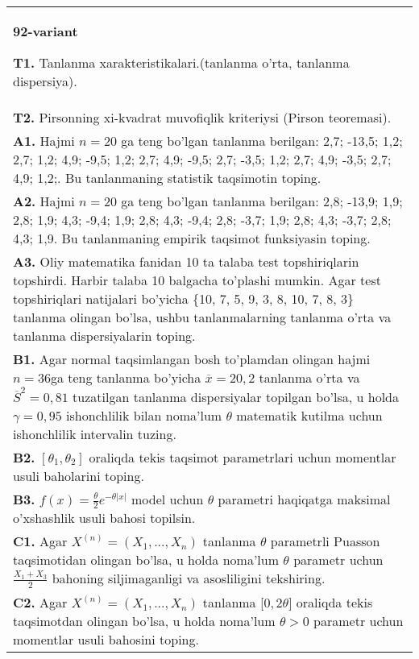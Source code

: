 \documentclass{article}
\begin{document}
\begin{tabular}{m{17cm}}
\textbf{92-variant}
\newline

\textbf{T1.} 
Tanlanma xarakteristikalari.(tanlanma o'rta, tanlanma dispersiya).
\\
\textbf{T2.} 
Pirsonning xi-kvadrat muvofiqlik kriteriysi (Pirson teoremasi).
\\
\textbf{A1.} 
Hajmi \(n = 20\) ga teng bo'lgan tanlanma berilgan: 2,7; -13,5; 1,2; 2,7; 1,2; 4,9; -9,5; 1,2; 2,7; 4,9; -9,5; 2,7; -3,5; 1,2; 2,7; 4,9; -3,5; 2,7; 4,9; 1,2;. Bu tanlanmaning statistik taqsimotin toping.
\\
\textbf{A2.} 
Hajmi \(n = 20\) ga teng bo'lgan tanlanma berilgan: 2,8; -13,9; 1,9; 2,8; 1,9; 4,3; -9,4; 1,9; 2,8; 4,3; -9,4; 2,8; -3,7; 1,9; 2,8; 4,3; -3,7; 2,8; 4,3; 1,9. Bu tanlanmaning empirik taqsimot funksiyasin toping.
\\
\textbf{A3.} 
Oliy matematika fanidan 10 ta talaba test topshiriqlarin topshirdi. Harbir talaba 10 balgacha to'plashi mumkin. Agar test topshiriqlari natijalari bo'yicha \{10, 7, 5, 9, 3, 8, 10, 7, 8, 3\} tanlanma olingan bo'lsa, ushbu tanlanmalarning tanlanma o'rta va tanlanma dispersiyalarin toping.
\\
\textbf{B1.} 
Agar normal taqsimlangan bosh to'plamdan olingan hajmi \(n = 36\)ga teng tanlanma bo'yicha \(\overline{x} = 20,2\) tanlanma o'rta va \({\overline{S}}^{2} = 0,81\) tuzatilgan tanlanma dispersiyalar topilgan bo'lsa, u holda \(\gamma = 0,95\) ishonchlilik bilan noma'lum \(\theta\) matematik kutilma uchun ishonchlilik intervalin tuzing.
\\
\textbf{B2.} 
\(\left\lbrack \theta_{1},\theta_{2} \right\rbrack\) oraliqda tekis taqsimot parametrlari uchun momentlar usuli baholarini toping.
\\
\textbf{B3.} 
\(f(x) = \frac{\theta}{2}e^{- \theta|x|}\) model uchun \(\theta\) parametri haqiqatga maksimal o'xshashlik usuli bahosi topilsin.
\\
\textbf{C1.} 
Agar \(X^{(n)} = \left( X_{1},...,X_{n} \right)\) tanlanma \(\theta\) parametrli Puasson taqsimotidan olingan bo'lsa, u holda noma'lum \(\theta\) parametr uchun \(\frac{X_{1} + X_{3}}{2}\) bahoning siljimaganligi va asosliligini tekshiring.
\\
\textbf{C2.} 
Agar \(X^{(n)} = \left( X_{1},...,X_{n} \right)\) tanlanma {[}\(0,2\theta\rbrack\) oraliqda tekis taqsimotdan olingan bo'lsa, u holda noma'lum \(\theta > 0\) parametr uchun momentlar usuli bahosini toping.
\\

\end{tabular}
\end{document}
